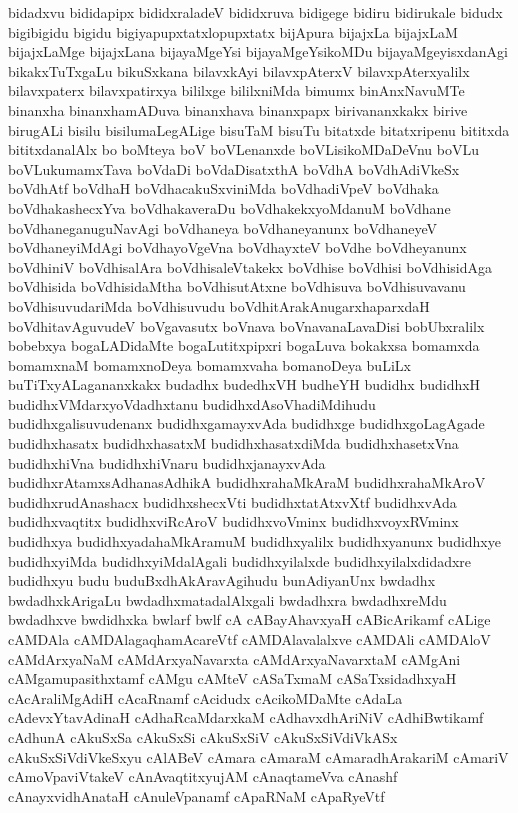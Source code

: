 {bidadxvu
bididapipx
bididxraladeV
bididxruva
bidigege
bidiru
bidirukale
bidudx
bigibigidu
bigidu
bigiyapupxtatxlopupxtatx
bijApura
bijajxLa
bijajxLaM
bijajxLaMge
bijajxLana
bijayaMgeYsi
bijayaMgeYsikoMDu
bijayaMgeyisxdanAgi
bikakxTuTxgaLu
bikuSxkana
bilavxkAyi
bilavxpAterxV
bilavxpAterxyalilx
bilavxpaterx
bilavxpatirxya
bililxge
bililxniMda
bimumx
binAnxNavuMTe
binanxha
binanxhamADuva
binanxhava
binanxpapx
birivananxkakx
birive
birugALi
bisilu
bisilumaLegALige
bisuTaM
bisuTu
bitatxde
bitatxripenu
bititxda
bititxdanalAlx
bo
boMteya
boV
boVLenanxde
boVLisikoMDaDeVnu
boVLu
boVLukumamxTava
boVdaDi
boVdaDisatxthA
boVdhA
boVdhAdiVkeSx
boVdhAtf
boVdhaH
boVdhacakuSxviniMda
boVdhadiVpeV
boVdhaka
boVdhakashecxYva
boVdhakaveraDu
boVdhakekxyoMdanuM
boVdhane
boVdhaneganuguNavAgi
boVdhaneya
boVdhaneyanunx
boVdhaneyeV
boVdhaneyiMdAgi
boVdhayoVgeVna
boVdhayxteV
boVdhe
boVdheyanunx
boVdhiniV
boVdhisalAra
boVdhisaleVtakekx
boVdhise
boVdhisi
boVdhisidAga
boVdhisida
boVdhisidaMtha
boVdhisutAtxne
boVdhisuva
boVdhisuvavanu
boVdhisuvudariMda
boVdhisuvudu
boVdhitArakAnugarxhaparxdaH
boVdhitavAguvudeV
boVgavasutx
boVnava
boVnavanaLavaDisi
bobUbxralilx
bobebxya
bogaLADidaMte
bogaLutitxpipxri
bogaLuva
bokakxsa
bomamxda
bomamxnaM
bomamxnoDeya
bomamxvaha
bomanoDeya
buLiLx
buTiTxyALagananxkakx
budadhx
budedhxVH
budheYH
budidhx
budidhxH
budidhxVMdarxyoVdadhxtanu
budidhxdAsoVhadiMdihudu
budidhxgalisuvudenanx
budidhxgamayxvAda
budidhxge
budidhxgoLagAgade
budidhxhasatx
budidhxhasatxM
budidhxhasatxdiMda
budidhxhasetxVna
budidhxhiVna
budidhxhiVnaru
budidhxjanayxvAda
budidhxrAtamxsAdhanasAdhikA
budidhxrahaMkAraM
budidhxrahaMkAroV
budidhxrudAnashacx
budidhxshecxVti
budidhxtatAtxvXtf
budidhxvAda
budidhxvaqtitx
budidhxviRcAroV
budidhxvoVminx
budidhxvoyxRVminx
budidhxya
budidhxyadahaMkAramuM
budidhxyalilx
budidhxyanunx
budidhxye
budidhxyiMda
budidhxyiMdalAgali
budidhxyilalxde
budidhxyilalxdidadxre
budidhxyu
budu
buduBxdhAkAravAgihudu
bunAdiyanUnx
bwdadhx
bwdadhxkArigaLu
bwdadhxmatadalAlxgali
bwdadhxra
bwdadhxreMdu
bwdadhxve
bwdidhxka
bwlarf
bwlf
cA
cABayAhavxyaH
cABicArikamf
cALige
cAMDAla
cAMDAlagaqhamAcareVtf
cAMDAlavalalxve
cAMDAli
cAMDAloV
cAMdArxyaNaM
cAMdArxyaNavarxta
cAMdArxyaNavarxtaM
cAMgAni
cAMgamupasithxtamf
cAMgu
cAMteV
cASaTxmaM
cASaTxsidadhxyaH
cAcAraliMgAdiH
cAcaRnamf
cAcidudx
cAcikoMDaMte
cAdaLa
cAdevxYtavAdinaH
cAdhaRcaMdarxkaM
cAdhavxdhAriNiV
cAdhiBwtikamf
cAdhunA
cAkuSxSa
cAkuSxSi
cAkuSxSiV
cAkuSxSiVdiVkASx
cAkuSxSiVdiVkeSxyu
cAlABeV
cAmara
cAmaraM
cAmaradhArakariM
cAmariV
cAmoVpaviVtakeV
cAnAvaqtitxyujAM
cAnaqtameVva
cAnashf
cAnayxvidhAnataH
cAnuleVpanamf
cApaRNaM
cApaRyeVtf
}
